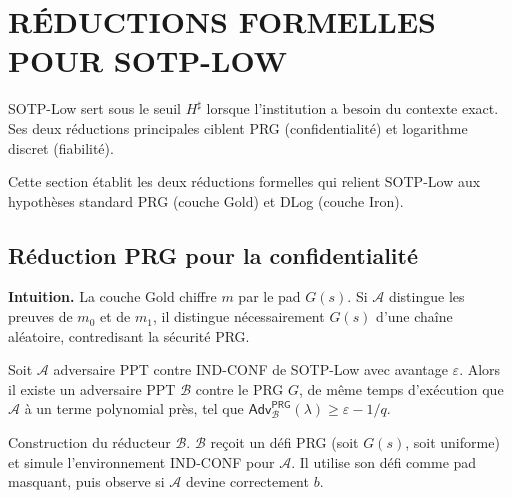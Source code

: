 \section{R\'EDUCTIONS FORMELLES POUR SOTP-LOW}
\label{sec:gamebased_SOTP-Low}
\begin{sloppypar}
SOTP-Low sert sous le seuil $H^\sharp$ lorsque l'institution a besoin du contexte exact.
Ses deux r\'eductions principales ciblent PRG (confidentialit\'e) et
logarithme discret (fiabilit\'e).

Cette section \'etablit les deux r\'eductions formelles qui relient SOTP-Low aux
hypoth\`eses standard PRG (couche Gold) et DLog (couche Iron).

\subsection{R\'eduction PRG pour la confidentialit\'e}

\noindent\textbf{Intuition.} La couche Gold chiffre $m$ par le pad $G(s)$.
Si $\mathcal{A}$ distingue les preuves de $m_0$ et de $m_1$, il distingue
n\'ecessairement $G(s)$ d'une cha\^ine al\'eatoire, contredisant la s\'ecurit\'e PRG.

\begin{theorem}\label{thm:ann_sotp_low_conf}
Soit $\mathcal{A}$ adversaire PPT contre IND-CONF de SOTP-Low avec
avantage $\varepsilon$. Alors il existe un adversaire PPT $\mathcal{B}$ contre le
PRG $G$, de m\^eme temps d'ex\'ecution que $\mathcal{A}$ \`a un terme polynomial pr\`es,
tel que $\mathsf{Adv}^{\mathsf{PRG}}_{\mathcal{B}}(\lambda) \geq \varepsilon - 1/q$.
\end{theorem}

\begin{Preuve}

\begin{cmtEtape}{Construction du r\'educteur $\mathcal{B}$.}
$\mathcal{B}$ re\c{c}oit un d\'efi PRG (soit $G(s)$, soit uniforme) et
simule l'environnement IND-CONF pour $\mathcal{A}$. Il utilise son
d\'efi comme pad masquant, puis observe si $\mathcal{A}$ devine
correctement $b$.
\end{cmtEtape}


\end{Preuve}
\end{sloppypar}
